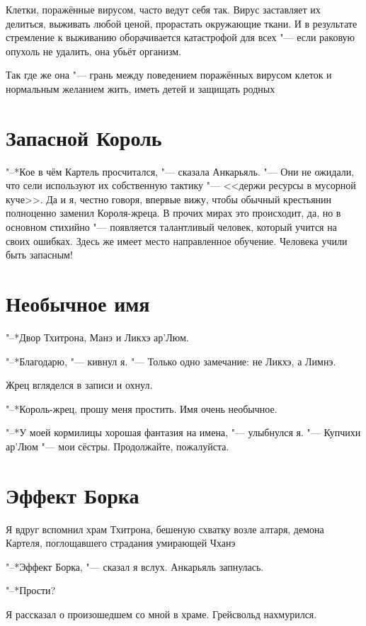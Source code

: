 Клетки, поражённые вирусом, часто ведут себя так.
Вирус заставляет их делиться, выживать любой ценой, прорастать окружающие ткани.
И в результате стремление к выживанию оборачивается катастрофой для всех "--- если раковую опухоль не удалить, она убьёт организм.

Так где же она "--- грань между поведением поражённых вирусом клеток и нормальным желанием жить, иметь детей и защищать родных\ldotsq

\section{Запасной Король}

"--*Кое в чём Картель просчитался, "--- сказала Анкарьяль.
"--- Они не ожидали, что сели используют их собственную тактику "--- <<держи ресурсы в мусорной куче>>.
Да и я, честно говоря, впервые вижу, чтобы обычный крестьянин полноценно заменил Короля-жреца.
В прочих мирах это происходит, да, но в основном стихийно "--- появляется талантливый человек, который учится на своих ошибках.
Здесь же имеет место направленное обучение.
Человека учили быть запасным!

\section{Необычное имя}

"--*Двор Тхитрона, Манэ и Ликхэ ар'Люм.

"--*Благодарю, "--- кивнул я.
"--- Только одно замечание: не Ликхэ, а Лимнэ.

Жрец вгляделся в записи и охнул.

"--*Король-жрец, прошу меня простить.
Имя очень необычное.

"--*У моей кормилицы хорошая фантазия на имена, "--- улыбнулся я.
"--- Купчихи ар'Люм "--- мои сёстры.
Продолжайте, пожалуйста.

\section{Эффект Борка}

Я вдруг вспомнил храм Тхитрона, бешеную схватку возле алтаря, демона Картеля, поглощавшего страдания умирающей Чханэ\ldotst

"--*Эффект Борка, "--- сказал я вслух.
Анкарьяль запнулась.

"--*Прости?

Я рассказал о произошедшем со мной в храме.
Грейсвольд нахмурился.

